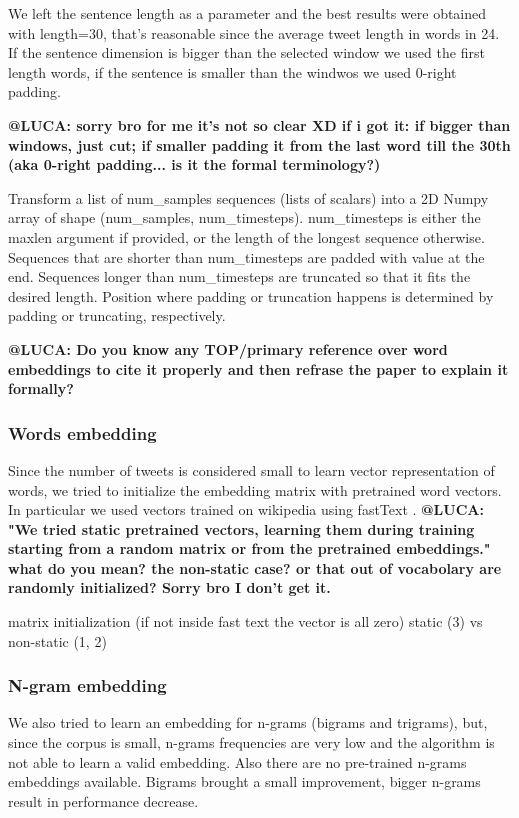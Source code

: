 We left the sentence length as a parameter and the best results were obtained with length=30, that's reasonable since the average tweet length in words in 24.
If the sentence dimension is bigger than the selected window we used the first length words, if the sentence is smaller than the windwos we used 0-right padding.

\textbf{@LUCA: sorry bro for me it's not so clear XD if i got it: if bigger than windows, just cut; if smaller padding it from the last word till the 30th (aka 0-right padding... is it the formal terminology?)}

Transform a list of num\_samples sequences (lists of scalars) into a 2D Numpy array of shape  (num\_samples, num\_timesteps). num\_timesteps is either the maxlen argument if provided, or the length of the longest sequence otherwise. Sequences that are shorter than num\_timesteps are padded with value at the end. Sequences longer than num\_timesteps are truncated so that it fits the desired length. Position where padding or truncation happens is determined by padding or truncating, respectively.


\textbf{@LUCA: Do you know any TOP/primary reference over word embeddings to cite it properly and then refrase the paper to explain it formally?}


\subsubsection{Words embedding}
Since the number of tweets is considered small to learn vector representation of words, we tried to initialize the embedding matrix with pretrained word vectors.
In particular we used vectors trained on wikipedia using fastText \cite{bojanowski2016enriching}.
\textbf{@LUCA: "We tried static pretrained vectors, learning them during training starting from a random matrix or from the pretrained embeddings." what do you mean? the non-static case? or that out of vocabolary are randomly initialized? Sorry bro I don't get it. }

matrix initialization (if not inside fast text the vector is all zero)
static (3) vs non-static (1, 2)


\subsubsection{N-gram embedding}
We also tried to learn an embedding for n-grams (bigrams and trigrams), but, since the corpus is small, n-grams frequencies are very low and the algorithm is not able to learn a valid embedding.
Also there are no pre-trained n-grams embeddings available.
Bigrams brought a small improvement, bigger n-grams result in performance decrease.


